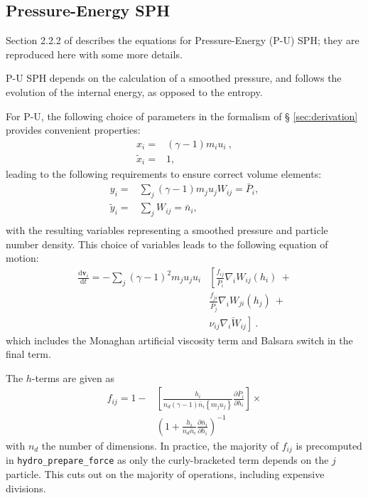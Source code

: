 \subsection{Pressure-Energy SPH}
\label{sec:sph:pu}

Section 2.2.2 of \cite{Hopkins2013} describes the equations for Pressure-Energy
(P-U) SPH; they are reproduced here with some more details.

P-U SPH depends on the calculation of a smoothed pressure, and follows the
evolution of the internal energy, as opposed to the entropy.

For P-U, the following choice of parameters in the formalism of \S
\ref{sec:derivation} provides convenient properties:
\begin{align}
  x_i =& (\gamma - 1) m_i u_i~, \\
  \tilde{x}_i =& 1,
  \label{eq:sph:pu:xichoice}
\end{align}
leading to the following requirements to ensure correct volume elements:
\begin{align}
  y_i =& \sum_{j} (\gamma - 1) m_j u_j W_{ij} = \bar{P}_i,\\
  \tilde{y}_i =& \sum_{j} W_{ij} = \bar{n}_i, \\
  \label{eq:sph:pu:yichoice}
\end{align}
with the resulting variables representing a smoothed pressure and particle
number density. This choice of variables leads to the following equation of
motion:
\begin{align}
  \frac{\mathrm{d} \mathbf{v}_i}{\mathrm{d} t} = -\sum_j (\gamma - 1)^2 m_j u_j u_i
	 &\left[\frac{f_{ij}}{\bar{P}_i} \nabla_i W_{ij}(h_i) ~+ \right. \\
	       &\frac{f_{ji}}{\bar{P}_j} \nabla_i W_{ji}(h_j) ~+ \\
	       & \left.\nu_{ij}\bar{\nabla_i W_{ij}}\right]~.
  \label{eq:sph:pu:eom}
\end{align}
which includes the Monaghan artificial viscosity term and Balsara switch in
the final term.

The $h$-terms are given as
\begin{align}
  f_{ij} = 1 - & \left[\frac{h_i}{n_d (\gamma - 1) \bar{n}_i \left\{m_j u_j\right\}}
		   \frac{\partial \bar{P}_i}{\partial h_i} \right] \times \\
               & \left( 1 + \frac{h_i}{n_d \bar{n}_i} \frac{\partial \bar{n}_i}{\partial h_i} \right)^{-1}
  \label{eq:sph:pu:fij}
\end{align}
with $n_d$ the number of dimensions. In practice, the majority of $f_{ij}$ is
precomputed in {\tt hydro\_prepare\_force} as only the curly-bracketed term
depends on the $j$ particle. This cuts out on the majority of operations,
including expensive divisions.

